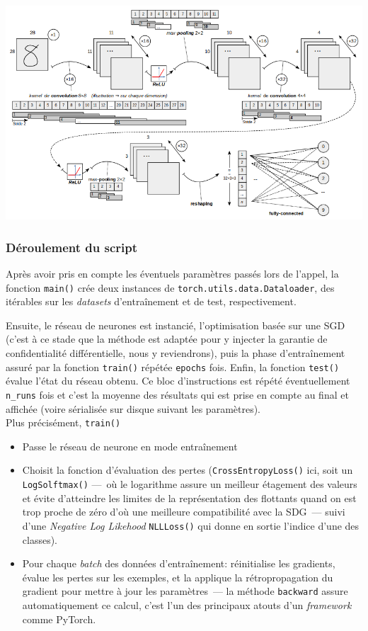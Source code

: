 \documentclass[a4paper,11pt]{article} %
\newcommand{\ttt}[1]{\texttt{#1}}
\begin{document}
%
    \hspace*{-0.3\textwidth}
	\includegraphics[width=1.6\textwidth]{cnn.png}

\subsubsection{Déroulement du script}
Après avoir pris en compte les éventuels paramètres passés lors de l'appel, la fonction \ttt{main()} crée deux instances de \ttt{torch.utils.data.Dataloader}, des itérables sur les \emph{datasets} d'entraînement et de test, respectivement.

Ensuite, le réseau de neurones est instancié, l'optimisation basée sur une SGD (c'est à ce stade que la méthode est adaptée pour y injecter la garantie de confidentialité différentielle, nous y reviendrons), puis la phase d'entraînement assuré par la fonction \ttt{train()} répétée \ttt{epochs} fois. Enfin, la fonction \ttt{test()} évalue  l'état du réseau obtenu. Ce bloc d'instructions est répété éventuellement \ttt{n\_runs} fois et c'est la moyenne des résultats qui est prise en compte au final et affichée (voire sérialisée sur disque suivant les paramètres).\\[0.4em]

Plus précisément, \ttt{train()}
\begin{itemize}
    \item
    Passe le réseau de neurone en \og mode entraînement\fg{}
    \item
    Choisit la fonction d'évaluation des pertes (\ttt{CrossEntropyLoss()} ici, soit un \ttt{LogSolftmax()} ---~où le logarithme assure un meilleur étagement des valeurs et évite d'atteindre les limites de la représentation des flottants quand on est trop proche de zéro d'où une meilleure compatibilité avec la SDG~--- suivi d'une \emph{Negative Log Likehood} \ttt{NLLLoss()} qui donne en sortie l'indice d'une des classes).
    \item
    Pour chaque \emph{batch} des données d'entraînement: réinitialise les gradients, évalue les pertes sur les exemples, et la applique la rétropropagation du gradient pour mettre à jour les paramètres~--- la méthode \ttt{backward} assure automatiquement ce calcul, c'est l'un des principaux atouts d'un \emph{framework}  comme \textsf{PyTorch}.
\end{itemize}
\end{document}
